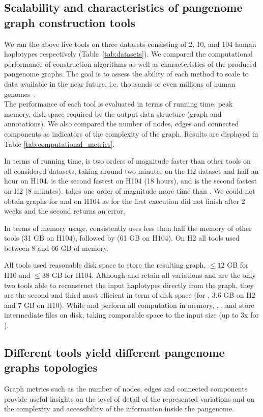 \subsection*{\textbf{Scalability and characteristics of pangenome graph construction tools \label{sec:results}}}
\label{sec:scalablility}
We ran the above five tools on three datasets consisting of 2, 10, and 104 human haplotypes respectively (Table~\mbox{\ref{tab:datasets}}). We compared the computational performance of construction algorithms as well as characteristics of the produced pangenome graphs.
The goal is to assess the ability of each method to scale to data available in the near future, i.e. thousands or even millions of human genomes~\cite{human-pangenomics-era}. \\
The performance of each tool is evaluated in terms of running time, peak memory, disk space required by the output data structure (graph and annotations). We also compared the number of nodes, edges and connected components as indicators of the complexity of the graph. Results are displayed in Table \ref{tab:computational_metrics}. 

In terms of running time, \mdbg is two orders of magnitude faster than other tools on all considered datasets, taking around two minutes on the H2 dataset and half an hour on H104.
\bifrost is the second fastest on H104 (18 hours), and \minigraph is the second fastest on H2 (8 minutes). \mcactus takes one order of magnitude more time than \minigraph. We could not obtain graphs for \pggb and \mcactus on H104 as for the first execution did not finish after 2 weeks and the second returns an error. 

In terms of memory usage, \mdbg consistently uses less than half the memory of other tools (31 GB on H104), followed by \minigraph (61 GB on H104). On H2 all tools used between 8 and 66 GB of memory.

All tools used reasonable disk space to store the resulting graph, $\leq 12$ GB for H10 and $\leq 38$ GB for H104. Although \mcactus and \pggb retain all variations and are the only two tools able to reconstruct the input haplotypes directly from the graph, they are the second and third most efficient in term of disk space (for \mcactus, 3.6 GB on H2 and 7 GB on H10). 
While \bifrost and \minigraph perform all computation in memory, \pggb, \mcactus, and \mdbg store intermediate files on disk, taking comparable space to the input size (up to 3x for \mcactus).  \\

\subsection*{\textbf{Different tools yield different pangenome graphs topologies}}
Graph metrics such as the number of nodes, edges and connected components provide useful insights on the level of detail of the represented variations and on the complexity and accessibility of the information inside the pangenome.

